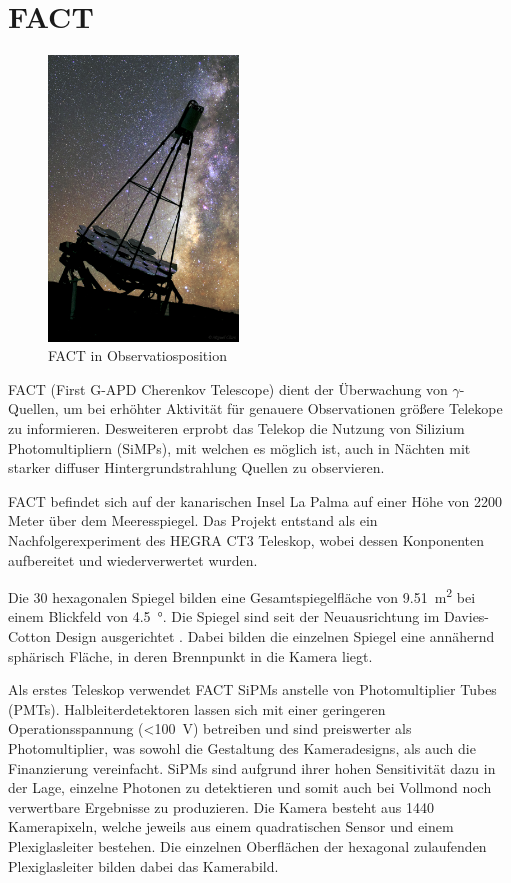 \chapter{FACT}
\begin{figure}
  \includegraphics[width=0.45\textwidth]{./images/FACT.jpg}
  \caption{FACT in Observatiosposition \cite{factpic}}
  \label{fig:observ}
\end{figure}
FACT (First G-APD Cherenkov Telescope) dient der Überwachung von $\gamma$-Quellen, um bei erhöhter Aktivität für genauere Observationen größere Telekope zu informieren. 
Desweiteren erprobt das Telekop die Nutzung von Silizium Photomultipliern (SiMPs), mit welchen es möglich ist, auch in Nächten mit starker diffuser Hintergrundstrahlung Quellen zu observieren. 

FACT befindet sich auf der kanarischen Insel La Palma auf einer Höhe von 2200 Meter über dem Meeresspiegel.
Das Projekt entstand als ein Nachfolgerexperiment des HEGRA CT3 Teleskop, wobei dessen Konponenten aufbereitet und wiederverwertet wurden.

Die 30 hexagonalen Spiegel bilden eine Gesamtspiegelfläche von \SI{9.51}{\meter\squared} bei einem Blickfeld von \SI{4.5}{\degree}. 
Die Spiegel sind seit der Neuausrichtung im Davies-Cotton Design ausgerichtet \cite{design-detec}.
Dabei bilden die einzelnen Spiegel eine annähernd sphärisch Fläche, in deren Brennpunkt in die Kamera liegt.

Als erstes Teleskop verwendet FACT SiPMs anstelle von Photomultiplier Tubes (PMTs). 
Halbleiterdetektoren lassen sich mit einer geringeren Operationsspannung (\SI{<100}{\volt}) betreiben und sind preiswerter als Photomultiplier, was sowohl die Gestaltung des Kameradesigns, als auch die Finanzierung vereinfacht. 
SiPMs sind aufgrund ihrer hohen Sensitivität dazu in der Lage, einzelne Photonen zu detektieren und somit auch bei Vollmond noch verwertbare Ergebnisse zu produzieren.
Die Kamera besteht aus 1440 Kamerapixeln, welche jeweils aus einem quadratischen Sensor und einem Plexiglasleiter bestehen. Die einzelnen Oberflächen der hexagonal zulaufenden Plexiglasleiter bilden dabei das Kamerabild.


